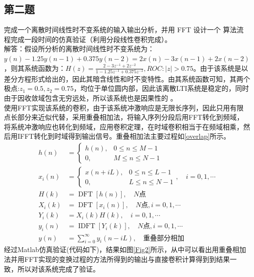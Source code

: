\documentclass{seuer}
\begin{document}
\subsection{第二题}
完成一个离散时间线性时不变系统的输入输出分析，并用 FFT 设计一个
算法流程完成一段时间的仿真验证（利用分段线性卷积完成）。
\\解答：假设所分析的离散时间线性时不变系统为：$y(n)-1.25 y(n-1)+0.375 y(n-2)=2 x(n)-3 x(n-1)+2 x(n-2)$，则其系统函数为：$H(z)=\frac{2-3z^{-1}+2z^{-2}}{1-1.25z^{-1}+0.375z^{-2}},ROC:|z|>0.75$。由于该系统是以差分方程形式给出的，因此其暗含线性和时不变特性。由其系统函数可知，其两个极点:$z_1=0.5,z_2=0.75$，均位于单位圆内部，因此该离散LTI系统是稳定的，同时由于因收敛域包含无穷远处，所以该系统也是因果性的 。
\\使用FFT实现该系统的卷积，由于该系统冲激响应是无限长序列，因此只用有限点长部分来近似代替，采用重叠相加法，将输入序列分段后用FFT转化到频域，将系统冲激响应也转化到频域，应用卷积定理，在时域卷积相当于在频域相乘，然后用IFFT转化到时域得到输出信号。重叠相加法主要过程如\ref{overlap}所示。
\begin{equation}\label{overlap}
	\begin{aligned}	
	h(n)&= \begin{cases}h(n), & 0 \leqslant n \leqslant M-1 \\ 0, & M \leqslant n \leqslant N-1\end{cases}
	\\x_i(n)&=\left\{\begin{array}{ll}x(n+i L), & 0 \leqslant n \leqslant L-1 \\ 0, & L \leqslant n \leqslant N-1\end{array}, \quad i=0,1, \cdots\right.
	\\H(k)&=\operatorname{DFT}[h(n)], \quad N 点
	\\X_i(k)&=\operatorname{DFT}\left[x_i(n)\right], \quad N 点 , i=0,1, \cdots
	\\Y_i(k)&=X_i(k) H(k), \quad i=0,1, \cdots
	\\y_i(n)&=\operatorname{IDFT}\left[Y_i(k)\right], \quad N 点, i=0,1, \cdots
	\\y(n)&=\sum_{i=0}^{\infty} y_i(n-i L), \quad \text{重叠部分相加}
    \end{aligned}
\end{equation}
经过Matlab仿真验证(代码如下)，结果如图\ref{Fig2}所示，从中可以看出用重叠相加法并用FFT实现的变换过程的方法所得到的输出与直接卷积计算得到到结果一致，所以对该系统完成了验证。
\lstset{language=Matlab}
\end{document}
